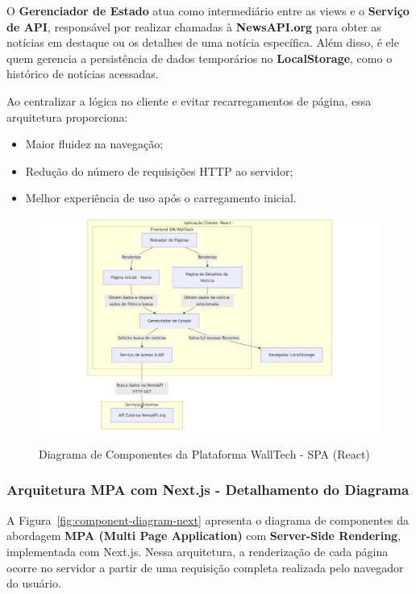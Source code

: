 O \textbf{Gerenciador de Estado} atua como intermediário entre as views e o \textbf{Serviço de API}, responsável por realizar chamadas à \textbf{NewsAPI.org} para obter as notícias em destaque ou os detalhes de uma notícia específica. Além disso, é ele quem gerencia a persistência de dados temporários no \textbf{LocalStorage}, como o histórico de notícias acessadas.

Ao centralizar a lógica no cliente e evitar recarregamentos de página, essa arquitetura proporciona:
\begin{itemize}
  \item Maior fluidez na navegação;
  \item Redução do número de requisições HTTP ao servidor;
  \item Melhor experiência de uso após o carregamento inicial.
\end{itemize}


\begin{figure}[H]
  \centering
  \caption{Diagrama de Componentes da Plataforma WallTech - SPA (React)}
  \includegraphics[width=1\textwidth]{media/component-diagram-react.jpeg}
  \label{fig:component-diagram-react}
\end{figure}




\subsubsection{Arquitetura MPA com Next.js - Detalhamento do Diagrama}

A Figura~\ref{fig:component-diagram-next} apresenta o diagrama de componentes da abordagem \textbf{MPA (Multi Page Application)} com \textbf{Server-Side Rendering}, implementada com Next.js. Nessa arquitetura, a renderização de cada página ocorre no servidor a partir de uma requisição completa realizada pelo navegador do usuário.

